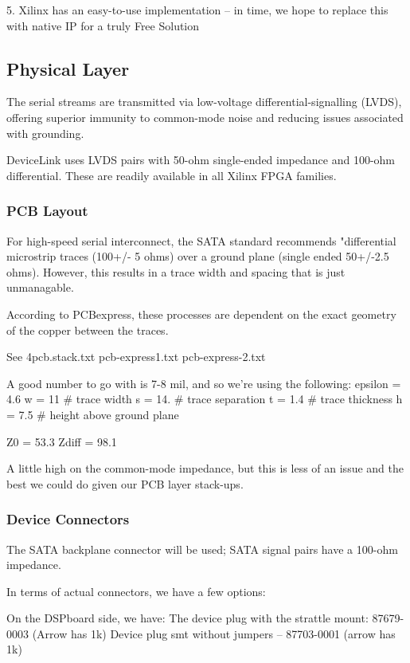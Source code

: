 5. Xilinx has an easy-to-use implementation -- in time, we hope to
   replace this with native IP for a truly Free Solution

\subsection{Physical Layer}
The serial streams are transmitted via low-voltage
differential-signalling (LVDS), offering superior immunity to
common-mode noise and reducing issues associated with grounding. 

DeviceLink uses LVDS pairs with 50-ohm single-ended impedance and
100-ohm differential. These are readily available in all Xilinx FPGA
families.

\subsubsection{PCB Layout} 
For high-speed serial interconnect, the SATA standard recommends "differential microstrip traces (100+/- 5 ohms) over a ground plane (single ended 50+/-2.5 ohms). However, this results in a trace width and spacing that is just unmanagable. 

According to PCBexpress, these processes are dependent on the exact
geometry of the copper between the traces.

See 4pcb.stack.txt
    pcb-express1.txt
    pcb-express-2.txt

A good number to go with is 7-8 mil, and so we're using the following:
epsilon = 4.6
w = 11 # trace width 
s = 14. # trace separation 
t = 1.4 # trace thickness 
h = 7.5 # height above ground plane

Z0 =  53.3
Zdiff =  98.1


A little high on the common-mode impedance, but this is less of an issue and the best we could do given our PCB layer stack-ups. 



\subsubsection{Device Connectors}

The SATA backplane connector will be used; SATA signal pairs have a
100-ohm impedance.

In terms of actual connectors, we have a few options: 

On the DSPboard side, we have: 
  The device plug with the strattle mount: 87679-0003 (Arrow has 1k)
  Device plug smt without jumpers -- 87703-0001 (arrow has 1k)

